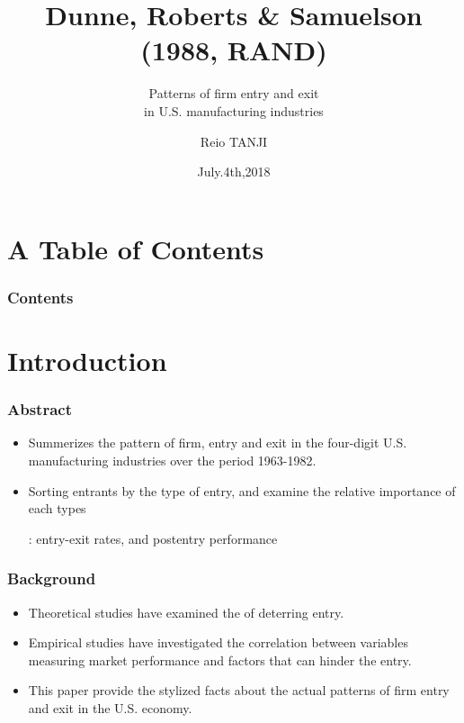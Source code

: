 \documentclass[dvipdfmx,12pt]{beamer}
\title{Dunne, Roberts \& Samuelson \\(1988, RAND)}
\subtitle{Patterns of firm entry and exit \\ in U.S. manufacturing industries}
\author{Reio TANJI}
\date{July.4th,2018}
\institute{Osaka University}
\begin{document}
\begin{frame}\frametitle{}
\titlepage
\end{frame}


\section*{A Table of Contents}
\begin{frame}\frametitle{Contents}
\tableofcontents
\end{frame}

\section{Introduction}
\begin{frame}\frametitle{Abstract}

 \begin{itemize}
 
 \item Summerizes the pattern of firm, entry and exit in the four-digit U.S. manufacturing industries over the period 1963-1982.
 
 \item Sorting entrants by the type of entry, and examine the relative importance of each types
 
 : entry-exit rates, and postentry performance
 
 \end{itemize}

\end{frame}

\begin{frame}\frametitle{Background}

 \begin{itemize}
 
 \item Theoretical studies have examined the of deterring entry.
 
 \item Empirical studies have investigated the correlation between variables measuring market performance and factors that can hinder the entry.
 
 \item This paper provide the stylized facts about the actual patterns of firm entry and exit in the U.S. economy.
 
 \end{itemize}

\end{frame}
\end{document}
